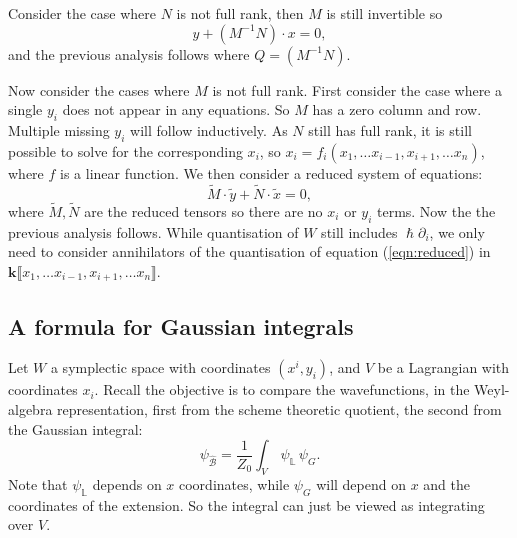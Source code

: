     Consider the case where \(N\) is not full rank, then \(M\) is still invertible so
    \[ y + (M^{-1} N) \cdot x = 0,\]
    and the previous analysis follows where \( Q = (M^{-1} N)\). 
    
    Now consider the cases where \(M\) is not full rank. First consider the case where a single \(y_i\) does not appear in any equations. So \(M\) has a zero column and row. Multiple missing \(y_i\) will follow inductively. As \(N\) still has full rank, it is still possible to solve for the corresponding \(x_i\), so \(x_i = f_i(x_1, \dots x_{i-1}, x_{i+1}, \dots x_n)\), where \(f\) is a linear function. We then consider a reduced system of equations:
    \begin{equation} \label{eqn:reduced} \widetilde{M}\cdot \widetilde{y} + \widetilde{N} \cdot \widetilde{x} = 0,\end{equation}
    where \(\widetilde{M}, \widetilde{N} \) are the reduced tensors so there are no \(x_i\) or \(y_i\) terms. Now the the previous analysis follows.  While quantisation of \(W\) still includes \( \hslash \partial_i \), we only need to consider annihilators of the quantisation of equation (\ref{eqn:reduced}) in \( \mathbf{k} \lBrack x_1, \dots x_{i-1}, x_{i+1}, \dots x_n\rBrack\).

    
    \subsection{A formula for Gaussian integrals}

    Let \(W\) a symplectic space with coordinates \( (x^i,y_i)\), and \(V\) be a Lagrangian with coordinates \(x_i\). Recall the objective is to compare the wavefunctions, in the Weyl-algebra representation, first from the scheme theoretic quotient, the second from the Gaussian integral:
    \begin{equation} 
    \label{eq:gaussint}
    \psi_{\widehat{\mathcal{B}}} = \frac{1}{Z_0} \int_{V} \,  \psi_{\mathbb{L}} \, \psi_G  . 
    \end{equation}
    Note that \( \psi_{\mathbb{L}} \) depends on \(x\) coordinates, while \( \psi_G\) will depend on \(x\) and the coordinates of the extension. So the integral can just be viewed as integrating over \(V\).
    
    
    
